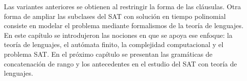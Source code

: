 \documentclass{report}
\theoremstyle{definition}
\theoremstyle{plain}
\theoremstyle{remark}
\begin{document}
Las variantes anteriores se obtienen al restringir la forma de las
cláusulas. Otra forma de ampliar las subclases del SAT con solución en
tiempo polinomial consiste en modelar el problema mediante formalismos
de la teoría de lenguajes. En este capítulo se introdujeron las nociones
en que se apoya ese enfoque: la teoría de lenguajes, el autómata finito,
la complejidad computacional y el problema SAT. En el próximo capítulo
se presentan las gramáticas de concatenación de rango y los antecedentes
en el estudio del SAT con teoría de lenguajes.



\end{document}
